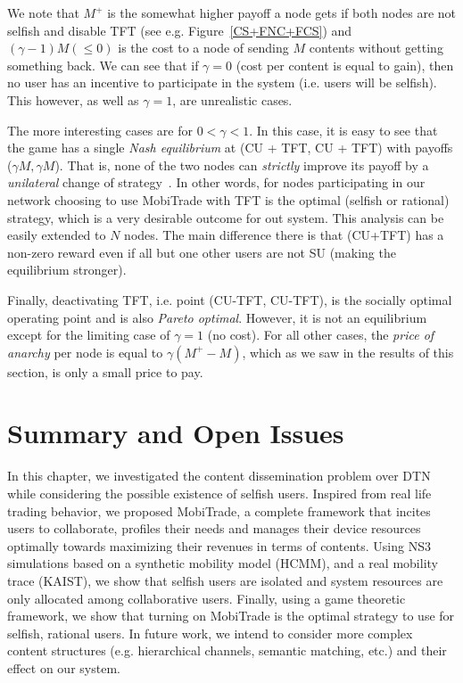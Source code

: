 We note that $M^{+}$ is the somewhat higher payoff a node gets if both nodes are not selfish and disable TFT (see e.g. Figure~\ref{CS+FNC+FCS}) and $(\gamma - 1)M (\le 0)$ is the cost to a node of sending $M$ contents without getting something back. We can see that if $\gamma = 0$ (cost per content is equal to gain), then no user has an incentive to participate in the system (i.e. users will be selfish). This however, as well as $\gamma = 1$, are unrealistic cases.

The more interesting cases are for $0 < \gamma < 1$. In this case, it is easy to see that the game has a single \emph{Nash equilibrium} at (CU + TFT, CU + TFT) with payoffs ($\gamma M, \gamma M$). That is, none of the two nodes can \emph{strictly} improve its payoff by a \emph{unilateral} change of strategy~\cite{game}. In other words, for nodes participating in our network choosing to use MobiTrade with TFT is the optimal (selfish or rational) strategy, which is a very desirable outcome for out system. This analysis can be easily extended to $N$ nodes. The main difference there is that (CU+TFT) has a non-zero reward even if all but one other users are not SU (making the equilibrium stronger).

Finally, deactivating TFT, i.e. point (CU-TFT, CU-TFT), is the socially optimal operating point and is also \emph{Pareto optimal}. However, it is not an equilibrium except for the limiting case of $\gamma = 1$ (no cost). For all other cases, the \emph{price of anarchy} per node is equal to $\gamma (M^{+} - M)$, which as we saw in the results of this section, is only a small price to pay.

\section{Summary and Open Issues}

In this chapter, we investigated the content dissemination problem over DTN while considering the possible existence of selfish users.
Inspired from real life trading behavior, we proposed MobiTrade, a complete framework that incites users to collaborate, profiles their needs and manages their device resources optimally towards maximizing their revenues in terms of contents. Using NS3 simulations based on a synthetic mobility model (HCMM), and a real mobility trace (KAIST), we show that selfish users are isolated and system resources are only allocated among collaborative users. Finally, using a game theoretic framework, we show that turning on MobiTrade is the optimal strategy to use for selfish, rational users. In future work, we intend to consider more complex content structures (e.g. hierarchical channels, semantic matching, etc.) and their effect on our system.
